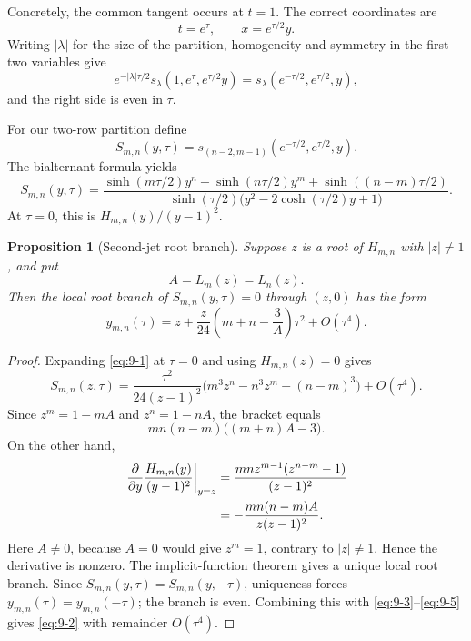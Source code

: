 \documentclass[11pt]{article}
\numberwithin{equation}{section}
\newtheorem{proposition}[theorem]{Proposition}
\theoremstyle{definition}
\begin{document}
Concretely, the common tangent occurs at \(t=1\).  The correct coordinates are
\[
 t=e^\tau,
 \qquad
 x=e^{\tau/2}y.
\]
Writing $|\lambda|$ for the size of the partition, homogeneity and symmetry
in the first two variables give
\[
 e^{-|\lambda|\tau/2}s_\lambda(1,e^\tau,e^{\tau/2}y)
 =s_\lambda(e^{-\tau/2},e^{\tau/2},y),
\]
and the right side is even in \(\tau\).

For our two-row partition define
\[
 S_{m,n}(y,\tau)
 =s_{(n-2,m-1)}(e^{-\tau/2},e^{\tau/2},y).
\]
The bialternant formula yields
\begin{equation}
 S_{m,n}(y,\tau)=
 \frac{
 \sinh(m\tau/2)y^n-
 \sinh(n\tau/2)y^m+
 \sinh((n-m)\tau/2)
 }{
 \sinh(\tau/2)
 \bigl(y^2-2\cosh(\tau/2)y+1\bigr)
 }.
 \label{eq:9-1}
\end{equation}
At \(\tau=0\), this is \(H_{m,n}(y)/(y-1)^2\).

\begin{proposition}[Second-jet root branch]\label{prop:secondjet}
Suppose $z$ is a root of $H_{m,n}$ with $|z|\neq1$, and put
\[
 A=L_m(z)=L_n(z).
\]
Then the local root branch of \(S_{m,n}(y,\tau)=0\) through \((z,0)\) has the
form
\begin{equation}
 y_{m,n}(\tau)=z+
 \frac z{24}\left(m+n-\frac3A\right)\tau^2+O(\tau^4).
 \label{eq:9-2}
\end{equation}
\end{proposition}

\begin{proof}
Expanding \eqref{eq:9-1} at \(\tau=0\) and using \(H_{m,n}(z)=0\) gives
\begin{equation}
 S_{m,n}(z,\tau)
 =\frac{\tau^2}{24(z-1)^2}
 \bigl(m^3z^n-n^3z^m+(n-m)^3\bigr)
 +O(\tau^4).
 \label{eq:9-3}
\end{equation}
Since \(z^m=1-mA\) and \(z^n=1-nA\), the bracket equals
\begin{equation}
 mn(n-m)\bigl((m+n)A-3\bigr).
 \label{eq:9-4}
\end{equation}
On the other hand,
\begin{align}
 \left.\frac{\partial}{\partial y}
 \frac{H_{m,n}(y)}{(y-1)^2}\right|_{y=z}
 &=\frac{mnz^{m-1}(z^{n-m}-1)}{(z-1)^2} \notag\\
 &=-\frac{mn(n-m)A}{z(z-1)^2}.
 \label{eq:9-5}
\end{align}
Here \(A\neq0\), because \(A=0\) would give \(z^m=1\), contrary to
\(|z|\neq1\).  Hence the derivative is nonzero.  The implicit-function
theorem gives a unique local root branch.  Since
\(S_{m,n}(y,\tau)=S_{m,n}(y,-\tau)\), uniqueness forces
\(y_{m,n}(\tau)=y_{m,n}(-\tau)\); the branch is even.  Combining this with
\eqref{eq:9-3}--\eqref{eq:9-5} gives \eqref{eq:9-2} with remainder \(O(\tau^4)\).
\end{proof}
\end{document}
